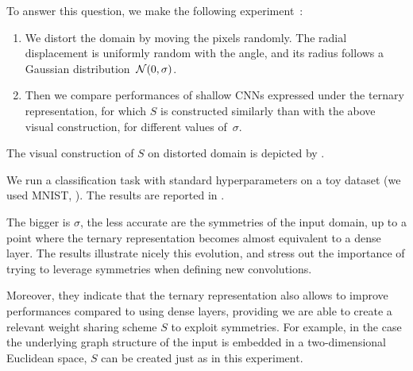 To answer this question, we make the following experiment~\citep{vialatte2016generalizing}:
\begin{enumerate}
\item We distort the domain by moving the pixels randomly. The radial displacement is uniformly random with the angle, and its radius follows a Gaussian distribution~$\mathcal{N}(0,\sigma)$.
\item Then we compare performances of shallow CNNs expressed under the ternary representation, for which $S$ is constructed similarly than with the above visual construction, for different values of~$\sigma$.
\end{enumerate}

The visual construction of $S$ on distorted domain is depicted by .



We run a classification task with standard hyperparameters on a toy dataset (we used MNIST, \cite{lecun1998mnist}). The results are reported in .



The bigger is $\sigma$, the less accurate are the symmetries of the input domain, up to a point where the ternary representation becomes almost equivalent to a dense layer. The results illustrate nicely this evolution, and stress out the importance of trying to leverage symmetries when defining new convolutions.

Moreover, they indicate that the ternary representation also allows to improve performances compared to using dense layers, providing we are able to create a relevant weight sharing scheme $S$ to exploit symmetries. For example, in the case the underlying graph structure of the input is embedded in a two-dimensional Euclidean space, $S$ can be created just as in this experiment.



